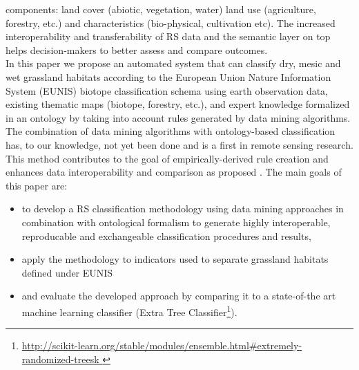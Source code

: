 \documentclass[authoryear, review,12pt,number]{elsarticle}
\begin{document}
components: land cover (abiotic, vegetation, water) land use (agriculture,
forestry, etc.) and characteristics (bio-physical, cultivation etc). The
increased interoperability and transferability of RS data and the semantic layer
on top helps decision-makers to better assess and compare outcomes. 
\\ 
In this paper we propose an automated system that can classify dry, mesic and
wet grassland habitats according to the European Union Nature Information System
(EUNIS) biotope classification schema using earth observation data, existing
thematic maps (biotope, forestry, etc.), and expert knowledge formalized in an
ontology by taking into account rules generated by data mining algorithms. The
combination of data mining algorithms with ontology-based classification has, to
our knowledge, not yet been done and is a first in remote sensing research. 
This method contributes to the goal of empirically-derived rule creation and enhances data interoperability and
comparison as proposed \cite{Janowicz2012}.
The main goals of this paper are:
\begin{itemize}
 \item to develop a RS classification methodology using data mining approaches
     in combination with ontological formalism to generate highly interoperable,
     reproducable and exchangeable classification procedures and results,
 \item apply the methodology to indicators used to separate grassland habitats
     defined under EUNIS
 \item and evaluate the developed approach by comparing it to a state-of-the art
     machine learning classifier (Extra Tree 
Classifier\footnote{\url{
http://scikit-learn.org/stable/modules/ensemble.html#extremely-randomized-treesk
}}).
\end{itemize}
\end{document}
